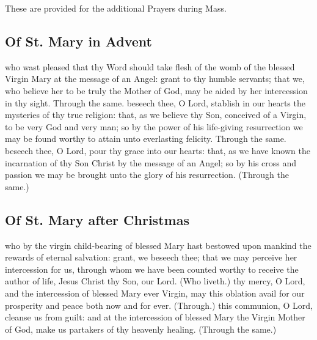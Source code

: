    \fancyhead[RO,LE]{}
   \fancyhead[RE,LO]{}
\begin{secrubric}
	These are provided for the additional Prayers during Mass.
\end{secrubric}

   \begin{multicols}{2}
   \subsection{Of St. Mary in Advent}\label{SPMaryInAdvent}
   \collect
    who wast pleased that thy Word should take flesh of the womb of the blessed Virgin Mary at the message of an Angel: grant to thy humble servants; that we, who believe her to be truly the Mother of God, may be aided by her intercession in thy sight. Through the same.
   \secret
    beseech thee, O Lord, stablish in our hearts the mysteries of thy true religion: that, as we believe thy Son, conceived of a Virgin, to be very God and very man; so by the power of his life-giving resurrection we may be found worthy to attain unto everlasting felicity. Through the same.
   \postcommunion
    beseech thee, O Lord, pour thy grace into our hearts: that, as we have known the incarnation of thy Son Christ by the message of an Angel; so by his cross and passion we may be brought unto the glory of his resurrection. (Through the same.)
   
   \newcolumn

    \subsection{Of St. Mary after Christmas}\label{SPMaryPostChristmas}
    \collect
     who by the virgin child-bearing of blessed Mary hast bestowed upon mankind the rewards of eternal salvation: grant, we beseech thee; that we may perceive her intercession for us, through whom we have been counted worthy to receive the author of life, Jesus Christ thy Son, our Lord. (Who liveth.)
    \secret
     thy mercy, O Lord, and the intercession of blessed Mary ever Virgin, may this oblation avail for our prosperity and peace both now and for ever. (Through.)
    \postcommunion
     this communion, O Lord, cleanse us from guilt: and at the intercession of blessed Mary the Virgin Mother of God, make us partakers of thy heavenly healing. (Through the same.)
    

\end{multicols}

